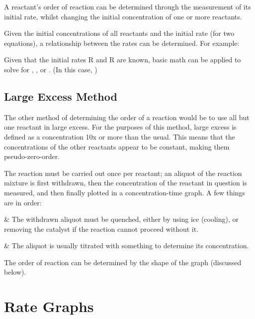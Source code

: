 			A reactant’s order of reaction can be determined through the measurement of its initial rate, whilst changing the initial
			concentration of one or more reactants.

			Given the initial concentrations of all reactants and the initial rate (for two equations), a relationship between the rates can be
			determined. For example:


			Given that the initial rates R and R are known, basic math can be applied to solve for , ,
			or . (In this case, )


		\subsection{Large Excess Method}

			The other method of determining the order of a reaction would be to use all but one reactant in large excess. For the purposes of this
			method, large excess is defined as a concentration 10x or more than the usual. This means that the concentrations of the other
			reactants appear to be constant, making them pseudo-zero-order.

			The reaction must be carried out once per reactant; an aliquot of the reaction mixture is first withdrawn, then the concentration of the
			reactant in question is measured, and then finally plotted in a concentration-time graph. A few things are in order:

			\begin{bulletlist}
				&	The withdrawn aliquot must be quenched, either by using ice (cooling), or removing the catalyst if the reaction cannot proceed
					without it.

				&	The aliquot is usually titrated with something to determine its concentration.
			\end{bulletlist}

			The order of reaction can be determined by the shape of the graph (discussed below).







	\pagebreak
	\section{Rate Graphs}


